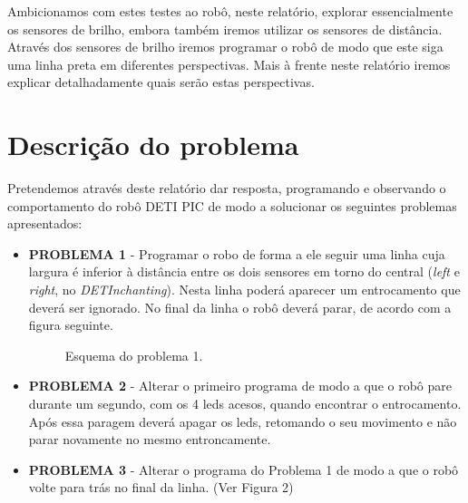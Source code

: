 \documentclass[a4paper, 12pt, onecolumn, oneside]{report}
\begin{document}
Ambicionamos com estes testes ao robô, neste relatório, explorar essencialmente os sensores de brilho, embora também iremos utilizar os sensores de distância. Através dos sensores de brilho iremos programar o robô de modo que este siga uma linha preta em diferentes perspectivas. Mais à frente neste relatório iremos explicar detalhadamente quais serão estas perspectivas. 







\newpage
\section{Descrição do problema}

Pretendemos através deste relatório dar resposta, programando e observando o comportamento do robô DETI PIC de modo a solucionar os seguintes problemas apresentados: 

\begin{itemize}
  \item \textbf{PROBLEMA 1} - Programar o robo de forma a ele seguir uma linha cuja largura é inferior à distância entre os dois sensores em torno do central (\emph{left} e \emph{right}, no \emph{DETInchanting}). Nesta linha poderá aparecer um entrocamento que deverá ser ignorado. No final da linha o robô deverá parar, de acordo com a figura seguinte. 
  
  
\begin{figure}[H] 
\center{\texttt{[image: f1]}}
\caption{Esquema do problema 1.}
\label{fig:speciation}
\end{figure}
  
\end{itemize}

\begin{itemize}
  \item \textbf{PROBLEMA 2} - Alterar o primeiro programa de modo a que o robô pare durante um segundo, com os 4 leds acesos, quando encontrar o entrocamento. Após essa paragem deverá apagar os leds, retomando o seu movimento e não parar novamente no mesmo entroncamente. 
\end{itemize}


\newpage
\begin{itemize}
  \item \textbf{PROBLEMA 3} - Alterar o programa do Problema 1 de modo a que o robô volte para trás no final da linha. (Ver Figura 2)
\end{itemize}
\end{document}
